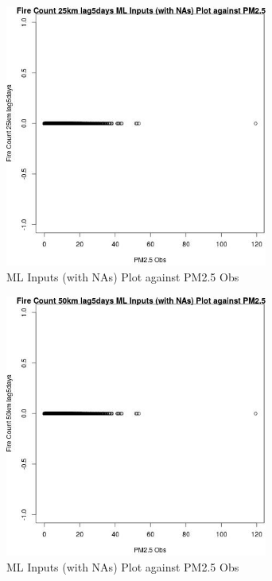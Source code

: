 \begin{figure} 
\centering  
\includegraphics[width=0.77\textwidth]{Code_Outputs/Report_ML_input_PM25_Step4_part_e_de_duplicated_aves_compiled_2019-05-18wNAs_Fire_Count_25km_lag5daysvPM25_Obs.jpg} 
\caption{\label{fig:Report_ML_input_PM25_Step4_part_e_de_duplicated_aves_compiled_2019-05-18wNAsFire_Count_25km_lag5daysvPM25_Obs}ML Inputs (with NAs) Plot against PM2.5 Obs} 
\end{figure} 
 

\begin{figure} 
\centering  
\includegraphics[width=0.77\textwidth]{Code_Outputs/Report_ML_input_PM25_Step4_part_e_de_duplicated_aves_compiled_2019-05-18wNAs_Fire_Count_50km_lag5daysvPM25_Obs.jpg} 
\caption{\label{fig:Report_ML_input_PM25_Step4_part_e_de_duplicated_aves_compiled_2019-05-18wNAsFire_Count_50km_lag5daysvPM25_Obs}ML Inputs (with NAs) Plot against PM2.5 Obs} 
\end{figure} 
 

